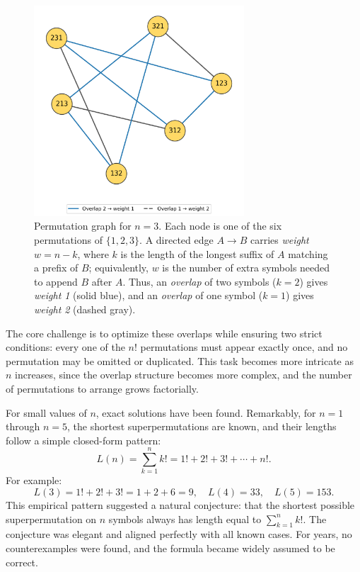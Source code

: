 \begin{figure}[ht]
  \centering
  \includegraphics[width=0.7\textwidth]{39_SuperpermutationsBreakthrough/permutation_graph_n3_spring.png}
  \caption{Permutation graph for $n=3$. Each node is one of the six permutations of $\{1,2,3\}$. A directed edge $A\to B$ carries \emph{weight} $w=n-k$, where $k$ is the length of the longest suffix of $A$ matching a prefix of $B$; equivalently, $w$ is the number of extra symbols needed to append $B$ after $A$. Thus, an \emph{overlap} of two symbols ($k=2$) gives \emph{weight 1} (solid blue), and an \emph{overlap} of one symbol ($k=1$) gives \emph{weight 2} (dashed gray).}
  \label{fig:permgraph3}
\end{figure}



The core challenge is to optimize these overlaps while ensuring two strict conditions: every one of the $n!$ permutations must appear exactly once, and no permutation may be omitted or duplicated. This task becomes more intricate as $n$ increases, since the overlap structure becomes more complex, and the number of permutations to arrange grows factorially.

For small values of $n$, exact solutions have been found. Remarkably, for $n = 1$ through $n = 5$, the shortest superpermutations are known, and their lengths follow a simple closed-form pattern:
\[
L(n) = \sum_{k=1}^n k! = 1! + 2! + 3! + \cdots + n!.
\]
For example:
\[
L(3) = 1! + 2! + 3! = 1 + 2 + 6 = 9, \quad
L(4) = 33, \quad
L(5) = 153.
\]
This empirical pattern suggested a natural conjecture: that the shortest possible superpermutation on $n$ symbols always has length equal to $\sum_{k=1}^n k!$. The conjecture was elegant and aligned perfectly with all known cases. For years, no counterexamples were found, and the formula became widely assumed to be correct.

